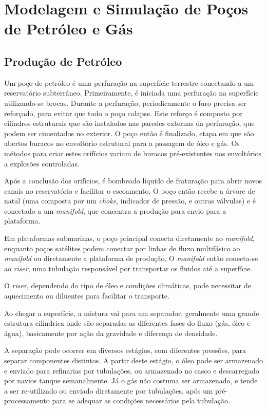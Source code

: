 

\chapter{Modelagem e Simulação de Poços de Petróleo e Gás} \label{chap:2}



\section{Produção de Petróleo}

Um poço de petróleo é uma perfuração na superfície terrestre conectando a um reservatório subterrâneo. 
%
Primeiramente, é iniciada uma perfuração na superfície utilizando-se brocas. 
%
Durante a perfuração, periodicamente o furo precisa ser reforçado, para evitar que todo o poço colapse. 
%
Este reforço é composto por cilindros estruturais que são instalados nas paredes externas da perfuração, que podem ser cimentados no exterior.\cite{gasProdHand}
%
O poço então é finalizado, etapa em que são abertos buracos no envoltório estrutural para a passagem de óleo e gás. 
%
Os métodos para criar estes orifícios variam de buracos pré-existentes nos envoltórios a explosões controladas.
%


Após a conclusão dos orifícios, é bombeado líquido de fraturação para abrir novos canais no reservatório e facilitar o escoamento.
%
O poço então recebe a árvore de natal (uma composta por um \textit{choke}, indicador de pressão, e outras válvulas) e é conectado a um \textit{manifold}, que concentra a produção para envio para a plataforma.
%

Em plataformas submarinas, o poço principal conecta diretamente ao \textit{manifold}, enquanto poços satélites podem conectar por linhas de fluxo multifásico ao \textit{manifold} ou diretamente a plataforma de produção.
%
O \textit{manifold} então conecta-se ao \textit{riser}, uma tubulação responsável por transportar os fluidos até a superfície.
%


O \textit{riser}, dependendo do tipo de óleo e condições climáticas, pode necessitar de aquecimento ou diluentes para facilitar o transporte.
%


Ao chegar a superfície, a mistura vai para um separador, geralmente uma grande estrutura cilíndrica onde são separadas as diferentes fases do fluxo (gás, óleo e água), basicamente por ação da gravidade e diferença de densidade.
%


A separação pode ocorrer em diversos estágios, com diferentes pressões, para separar componentes distintos.
%
A partir deste estágio, o óleo pode ser armazenado e enviado para refinarias por tubulações, ou armazenado no casco e descarregado por navios tanque semanalmente.
%
Já o gás não costuma ser armazenado, e tende a ser re-utilizado ou enviado diretamente por tubulações, após um pré-processamento para se adequar as condições necessárias pela tubulação.
%

